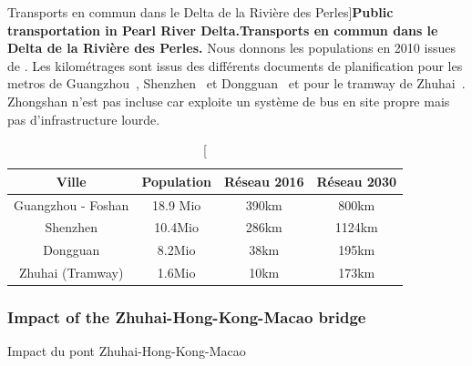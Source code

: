 \begin{table}
\caption[Public transportation in Pearl River Delta][Transports en commun dans le Delta de la Rivière des Perles]{\textbf{Public transportation in Pearl River Delta.}\label{tab:casestudies:stats}}{\textbf{Transports en commun dans le Delta de la Rivière des Perles.} Nous donnons les populations en 2010 issues de \cite{yearbook2013guangdong}. Les kilométrages sont issus des différents documents de planification pour les metros de Guangzhou~\cite{guangzhou2016metro}, Shenzhen~\cite{shenzhen2016plan} et Dongguan~\cite{dongguan2017ditie} et pour le tramway de Zhuhai~\cite{zhuhai2016tram}. Zhongshan n'est pas incluse car exploite un système de bus en site propre mais pas d'infrastructure lourde.\label{tab:casestudies:stats}}
\begin{tabular}{|c|c|c|c|}\hline
	Ville & Population & Réseau 2016 & Réseau 2030 \\\hline
	Guangzhou - Foshan & 18.9 Mio & 390km & 800km \\\hline
	Shenzhen & 10.4Mio & 286km & 1124km \\\hline
	Dongguan & 8.2Mio & 38km & 195km \\\hline
	Zhuhai (Tramway) & 1.6Mio & 10km & 173km \\\hline
\end{tabular}	
\end{table}




\subsubsection{Impact of the Zhuhai-Hong-Kong-Macao bridge}{Impact du pont Zhuhai-Hong-Kong-Macao}

